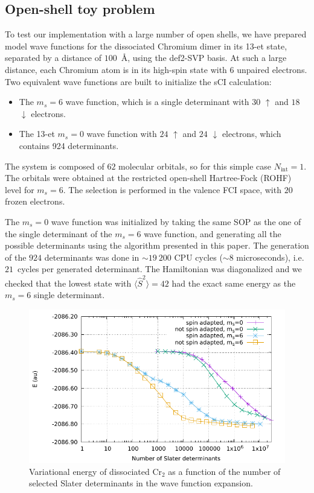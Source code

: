 \documentclass[aip,jcp,reprint,showkeys]{revtex4-1}
\newcommand{\stwo}{\hat{S}^2}
\newcommand{\up}{\uparrow}
\newcommand{\dn}{\downarrow}
\newcommand{\Nint}{{N_\text{int}}}
\newcommand{\sop}{SOP}
\newcommand{\sci}{sCI}
\newcommand{\cpu}{CPU}
\begin{document}
\subsection{Open-shell toy problem}

To test our implementation with a large number of open shells, we have prepared
model wave functions for the dissociated Chromium dimer in its 13-et state, separated by a
distance of $100$~\AA, using the def2-SVP basis.\cite{Weigend_2005}
At such a large distance, each Chromium atom is in its high-spin state with $6$
unpaired electrons. Two equivalent wave functions are built to initialize the \sci{}
calculation:
\begin{itemize}
\item The $m_s=6$ wave function, which is a single determinant with $30$ $\up$
      and $18$ $\dn$ electrons.
\item The 13-et $m_s=0$ wave function with $24$ $\up$ and $24$ $\dn$ electrons, which
      contains 924 determinants.
\end{itemize}
The system is composed of $62$ molecular orbitals, so for this simple case $\Nint=1$.
The orbitals were obtained at the restricted open-shell Hartree-Fock (ROHF) level
for $m_s=6$.
The selection is performed in the valence FCI space, with $20$ frozen electrons.

The $m_s=0$ wave function was initialized by taking the same {\sop} as the
one of the single determinant of the $m_s=6$ wave function, and generating all
the possible determinants using the algorithm presented in this paper.
The generation of the $924$ determinants was done in $\sim 19~200$
\cpu{} cycles ($\sim8$ microseconds), i.e.  $21$~cycles per generated determinant. The Hamiltonian was
diagonalized and we checked that the lowest state with $\langle \stwo \rangle =
42$ had the exact same energy as the $m_s=6$ single determinant.

\begin{figure}
\includegraphics[width=0.9\columnwidth]{e_var_ndet}
\caption{Variational energy of dissociated Cr$_2$ as a function of the number of
selected Slater determinants in the wave function expansion.}
\label{fig:e_var_ndet}
\end{figure}
\end{document}
